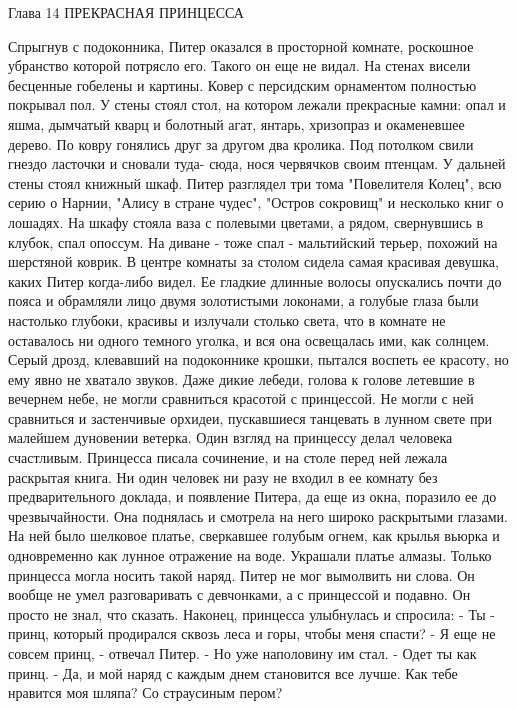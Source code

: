         Глава 14
        ПРЕКРАСНАЯ ПРИНЦЕССА

    Спрыгнув с подоконника, Питер оказался в просторной комнате, 
роскошное убранство которой потрясло его. Такого он еще не видал. На 
стенах висели бесценные гобелены и картины. Ковер с персидским 
орнаментом полностью покрывал пол. У стены стоял стол, на котором 
лежали прекрасные камни: опал и яшма, дымчатый кварц и болотный агат, 
янтарь, хризопраз и окаменевшее дерево. По ковру гонялись друг за 
другом два кролика. Под потолком свили гнездо ласточки и сновали туда-
сюда, нося червячков своим птенцам.
    У дальней стены стоял книжный шкаф. Питер разглядел три тома 
"Повелителя Колец", всю серию о Нарнии, "Алису в стране чудес", 
"Остров сокровищ" и несколько книг о лошадях. На шкафу стояла ваза с 
полевыми цветами, а рядом, свернувшись в клубок, спал опоссум. На 
диване - тоже спал - мальтийский терьер, похожий на шерстяной коврик.
    В центре комнаты за столом сидела самая красивая девушка, каких 
Питер когда-либо видел. Ее гладкие длинные волосы опускались почти до 
пояса и обрамляли лицо двумя золотистыми локонами, а голубые глаза 
были настолько глубоки, красивы и излучали столько света, что в 
комнате не оставалось ни одного темного уголка, и вся она освещалась 
ими, как солнцем.
    Серый дрозд, клевавший на подоконнике крошки, пытался воспеть ее 
красоту, но ему явно не хватало звуков. Даже дикие лебеди, голова к 
голове летевшие в вечернем небе, не могли сравниться красотой с 
принцессой. Не могли с ней сравниться и застенчивые орхидеи, 
пускавшиеся танцевать в лунном свете при малейшем дуновении ветерка.
    Один взгляд на принцессу делал человека счастливым.
    Принцесса писала сочинение, и на столе перед ней лежала раскрытая 
книга. Ни один человек ни разу не входил в ее комнату без 
предварительного доклада, и появление Питера, да еще из окна, поразило 
ее до чрезвычайности. Она поднялась и смотрела на него широко 
раскрытыми глазами. На ней было шелковое платье, сверкавшее голубым 
огнем, как крылья вьюрка и одновременно как лунное отражение на воде. 
Украшали платье алмазы. Только принцесса могла носить такой наряд.
    Питер не мог вымолвить ни слова. Он вообще не умел разговаривать с 
девчонками, а с принцессой и подавно. Он просто не знал, что сказать.
    Наконец, принцесса улыбнулась и спросила:
    - Ты - принц, который продирался сквозь леса и горы, чтобы меня 
спасти?
    - Я еще не совсем принц, - отвечал Питер. - Но уже наполовину им 
стал.
    - Одет ты как принц.
    - Да, и мой наряд с каждым днем становится все лучше. Как тебе 
нравится моя шляпа? Со страусиным пером?
